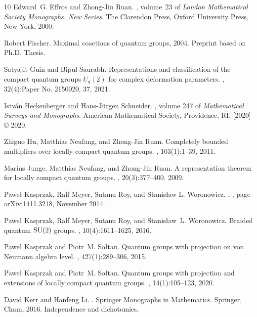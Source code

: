 \documentclass[12pt,reqno,a4paper]{amsart}
\theoremstyle{definition}
\numberwithin{equation}{section}
\begin{document}
\begin{thebibliography}{10}
Edward~G. Effros and Zhong-Jin Ruan.
, volume~23 of {\em London Mathematical Society
  Monographs. New Series}.
\newblock The Clarendon Press, Oxford University Press, New York, 2000.

Robert Fischer.
\newblock Maximal coactions of quantum groups, 2004.
\newblock Preprint based on Ph.D. Thesis.

Satyajit Guin and Bipul Saurabh.
\newblock Representations and classification of the compact quantum groups
  {$U_q(2)$} for complex deformation parameters.
, 32(4):Paper No. 2150020, 37, 2021.

Istv\'an Heckenberger and Hans-J\"urgen Schneider.
, volume 247 of {\em Mathematical
  Surveys and Monographs}.
\newblock American Mathematical Society, Providence, RI, [2020] \copyright
  2020.

Zhiguo Hu, Matthias Neufang, and Zhong-Jin Ruan.
\newblock Completely bounded multipliers over locally compact quantum groups.
, 103(1):1--39, 2011.

Marius Junge, Matthias Neufang, and Zhong-Jin Ruan.
\newblock A representation theorem for locally compact quantum groups.
, 20(3):377--400, 2009.

Pawe{\l} {Kasprzak}, Ralf {Meyer}, Sutanu {Roy}, and Stanis{\l}aw {L.
  Woronowicz}.
.
, page arXiv:1411.3218, November 2014.

Pawe{\l} Kasprzak, Ralf Meyer, Sutanu Roy, and Stanis{\l}aw~L. Woronowicz.
\newblock Braided quantum {$\rm SU(2)$} groups.
, 10(4):1611--1625, 2016.

Pawe{\l} Kasprzak and Piotr~M. So{\l}tan.
\newblock Quantum groups with projection on von {N}eumann algebra level.
, 427(1):289--306, 2015.

Pawe{\l} Kasprzak and Piotr~M. So{\l}tan.
\newblock Quantum groups with projection and extensions of locally compact
  quantum groups.
, 14(1):105--123, 2020.

David Kerr and Hanfeng Li.
.
\newblock Springer Monographs in Mathematics. Springer, Cham, 2016.
\newblock Independence and dichotomies.


\end{thebibliography}
\end{document}
